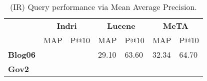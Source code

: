 \begin{table}[t]
\centering
{\small
    \begin{tabular}{|l|p{.65cm}p{.65cm}|p{.65cm}p{.65cm}|p{.65cm}p{.65cm}|}
    \hline &
    \multicolumn{2}{c|}{\textbf{Indri}} &
    \multicolumn{2}{c|}{\textbf{Lucene}} &
    \multicolumn{2}{c|}{\textbf{MeTA}} \\
    & MAP & P@10 & MAP & P@10 & MAP & P@10\\
    \hline
    \textbf{Blog06} & & & 29.10 & 63.60 & 32.34 & 64.70 \\
    \textbf{Gov2} & & & & & & \\
    \hline
\end{tabular}
\caption{(IR) Query performance via Mean Average Precision.}
\label{table:ir-map}
}
\end{table}
